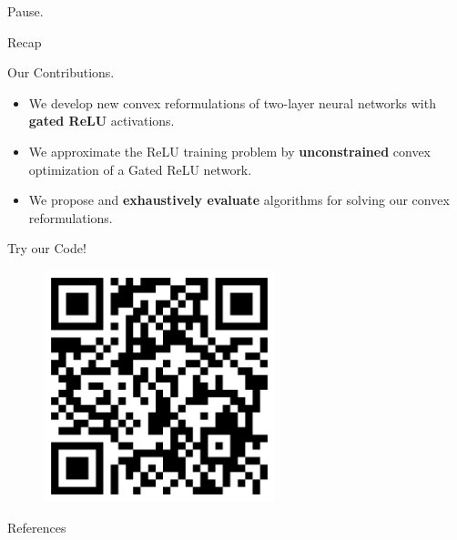 \documentclass[usenames,dvipsnames,mathserif,notheorems]{beamer}
\begin{document}

\begin{frame}{}
	\begin{center}
		\huge Pause.
	\end{center}
\end{frame}

\begin{frame}{Recap}
	\begin{center}
		\huge   Our Contributions.
	\end{center}

	\vspace{2em}
	\pause
	{ \large
		\begin{itemize}
			\item We develop new convex reformulations of two-layer neural networks
			      with \textbf{gated ReLU} activations.\pause
			      \vspace{0.5em}

			\item We  approximate the ReLU training problem by \textbf{unconstrained}
			      convex optimization of a Gated ReLU network.\pause
			      \vspace{0.5em}

			\item We propose and \textbf{exhaustively evaluate} algorithms for solving
			      our convex reformulations.
		\end{itemize}
	}

\end{frame}




\begin{frame}{}
	\begin{center}
		\huge Try our Code!
	\end{center}

	\begin{figure}[]
		\centering
		\includegraphics[width=0.6\textwidth]{assets/github.png}
	\end{figure}
\end{frame}

\begin{frame}[allowframebreaks]{References}
	\printbibliography[]
\end{frame}
\end{document}
